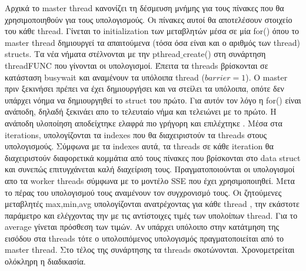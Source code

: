 \documentclass[11pt]{article}
\begin{document}
Αρχικά το  master thread  κανονίζει τη δέσμευση μνήμης για τους πίνακες που θα χρησιμοποιηθούν για τους υπολογισμούς. Οι πίνακες αυτοί θα αποτελέσουν στοιχείο του κάθε  thread. Γίνεται το initialization των μεταβλητών μέσα σε μία for() όπου το master thread  δημιουργεί τα απαιτούμενα (τόσα όσα είναι και ο αριθμός των  thread) structs. Τα νέα νήματα στέλνονται με την  pthread$\_$create()  στη συνάρτηση  threadFUNC   που γίνονται οι υπολογισμοί. Έπειτα τα  threads  βρίσκονται σε κατάσταση  busywait και αναμένουν τα υπόλοιπα thread ($barrier=1$). Ο master πριν ξεκινήσει πρέπει να έχει δημιουργήσει και να στείλει τα υπόλοιπα, οπότε δεν υπάρχει νόημα να δημιουργηθεί το struct του πρώτο. Για αυτόν τον λόγο η for() είναι ανάποδη, δηλαδή ξεκινάει απο το τελευταίο νήμα και τελειώνει με το πρώτο. H ανάποδη υλοποίηση αποδείχτηκε ελαφρά πιο γρήγορη και επιλέχτηκε . Μέσα στα  iterations,  υπολογίζονται τα  indexes  που θα διαχειριστούν τα  threads  στους υπολογισμούς. Σύμφωνα με τα  indexes αυτά, τα threads  σε κάθε iteration θα διαχειριστούν διαφορετικά κομμάτια από τους πίνακες που βρίσκονται στο  data struct   και συνεπώς επιτυγχάνεται καλή διαχείριση τους. Πραγματοποιούνται οι υπολογισμοί  απο τα  worker threads  σύμφωνα με το μοντέλο  SSE που έχει χρησιμοποιηθεί. Μετα το πέρας του υπολογισμού τους αναμένουν τον συγχρονισμό τους. Οι ζητούμενες μεταβλητές  max,min,avg  υπολογίζονται ανατρέχοντας για κάθε  thread , την εκάστοτε παράμετρο και ελέγχοντας την με τις αντίστοιχες τιμές των υπολοίπων  thread. Για το  average  γίνεται πρόσθεση των τιμών. Αν υπάρχει υπόλοιπο στην κατάτμηση της εισόδου στα  threads  τότε ο υπολοιπόμενος υπολογισμός πραγματοποιείται από το  master thread. Στο τέλος της συνάρτησης τα   threads  σκοτώνονται. Χρονομετρείται ολόκληρη η διαδικασία.
\end{document}
